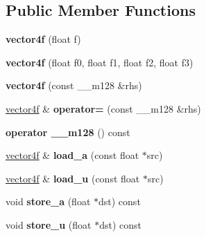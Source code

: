 \subsection*{Public Member Functions}
\begin{DoxyCompactItemize}
\item 
\hypertarget{classsimd_1_1vector4f_a8cd2fc3260d14c0c67940a983a69a6e0}{{\bfseries vector4f} (float f)}\label{classsimd_1_1vector4f_a8cd2fc3260d14c0c67940a983a69a6e0}

\item 
\hypertarget{classsimd_1_1vector4f_a851a8e9f17c7608f082a110d48511d9d}{{\bfseries vector4f} (float f0, float f1, float f2, float f3)}\label{classsimd_1_1vector4f_a851a8e9f17c7608f082a110d48511d9d}

\item 
\hypertarget{classsimd_1_1vector4f_acfe638dab1c1d516989304bd62b87522}{{\bfseries vector4f} (const \+\_\+\+\_\+m128 \&rhs)}\label{classsimd_1_1vector4f_acfe638dab1c1d516989304bd62b87522}

\item 
\hypertarget{classsimd_1_1vector4f_ac6b2d78f7edf02288544a273109f7bce}{\hyperlink{classsimd_1_1vector4f}{vector4f} \& {\bfseries operator=} (const \+\_\+\+\_\+m128 \&rhs)}\label{classsimd_1_1vector4f_ac6b2d78f7edf02288544a273109f7bce}

\item 
\hypertarget{classsimd_1_1vector4f_a433d39bba6d70a4406fb70315d1d700c}{{\bfseries operator \+\_\+\+\_\+m128} () const }\label{classsimd_1_1vector4f_a433d39bba6d70a4406fb70315d1d700c}

\item 
\hypertarget{classsimd_1_1vector4f_a3f144eedb574683f0a74c816f06da9b5}{\hyperlink{classsimd_1_1vector4f}{vector4f} \& {\bfseries load\+\_\+a} (const float $\ast$src)}\label{classsimd_1_1vector4f_a3f144eedb574683f0a74c816f06da9b5}

\item 
\hypertarget{classsimd_1_1vector4f_a96eb6874cdcc0da473900f7798219ef0}{\hyperlink{classsimd_1_1vector4f}{vector4f} \& {\bfseries load\+\_\+u} (const float $\ast$src)}\label{classsimd_1_1vector4f_a96eb6874cdcc0da473900f7798219ef0}

\item 
\hypertarget{classsimd_1_1vector4f_a9084f345c629897c16c73858b112677d}{void {\bfseries store\+\_\+a} (float $\ast$dst) const }\label{classsimd_1_1vector4f_a9084f345c629897c16c73858b112677d}

\item 
\hypertarget{classsimd_1_1vector4f_ab7bc248d1ac6e5dbc7aba78034063ac1}{void {\bfseries store\+\_\+u} (float $\ast$dst) const }\label{classsimd_1_1vector4f_ab7bc248d1ac6e5dbc7aba78034063ac1}


\end{DoxyCompactItemize}
